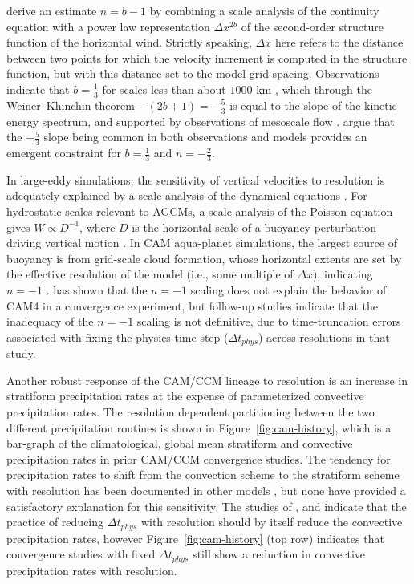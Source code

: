 \documentclass[times]{qjrms4}
\begin{document}
\cite{RETAL2016CD} derive an estimate $n= b-1$ by combining a scale analysis of the continuity equation with a power law representation $\Delta x^{2b}$ of the second-order structure function of the horizontal wind. Strictly speaking, $\Delta x$ here refers to the distance between two points for which the velocity increment is computed in the structure function, but with this distance set to the model grid-spacing. Observations indicate that $b=\frac{1}{3}$ for scales less than about $1000$ km \citep{CETAL1999JGR}, which through the Weiner–Khinchin theorem $- \left( 2b+1 \right) = -\frac{5}{3}$ is equal to the slope of the kinetic energy spectrum, and supported by observations of mesoscale flow \citep{NG1985JAS}. \cite{RETAL2016CD} argue that the $-\frac{5}{3}$ slope being common in both observations and models provides an emergent constraint for $b=\frac{1}{3}$ and $n= -\frac{2}{3}$.

In large-eddy simulations, the sensitivity of vertical velocities to resolution is adequately explained by a scale analysis of the dynamical equations \citep{WETAL1997MWR,PG2006JAS,JR2016QJRMS}. For hydrostatic scales relevant to AGCMs, a scale analysis of the Poisson equation gives $W \propto D^{-1}$, where $D$ is the horizontal scale of a buoyancy perturbation driving vertical motion \citep{HR2018JAMES}. In CAM aqua-planet simulations, the largest source of buoyancy is from grid-scale cloud formation, whose horizontal extents are set by the effective resolution of the model (i.e., some multiple of $\Delta x$), indicating $n=-1$ \citep{HR2018JAMES}. \cite{HR2017JCLIM} has shown that the $n=-1$ scaling does not explain the behavior of CAM4 in a convergence experiment, but follow-up studies \citep{HR2018JAMES,HETAL2019JAMES} indicate that the inadequacy of the $n=-1$ scaling is not definitive, due to time-truncation errors associated with fixing the physics time-step ($\Delta t_{phys}$) across resolutions in that study.

Another robust response of the CAM/CCM lineage to resolution is an increase in stratiform precipitation rates at the expense of parameterized convective precipitation rates. The resolution dependent partitioning between the two different precipitation routines is shown in Figure~\ref{fig:cam-history}, which is a bar-graph of the climatological, global mean stratiform and convective precipitation rates in prior CAM/CCM convergence studies. The tendency for precipitation rates to shift from the convection scheme to the stratiform scheme with resolution has been documented in other models \citep{PS2002CD,RETAL2016CD,TETAL2018CD}, but none have provided a satisfactory explanation for this sensitivity. The studies of \cite{KW1991JGR}, \cite{WETAL1995CD} and \cite{W2013QJRMS} indicate that the practice of reducing $\Delta t_{phys}$ with resolution should by itself reduce the convective precipitation rates, however Figure~\ref{fig:cam-history} (top row) indicates that convergence studies with fixed $\Delta t_{phys}$ still show a reduction in convective precipitation rates with resolution.
\end{document}
